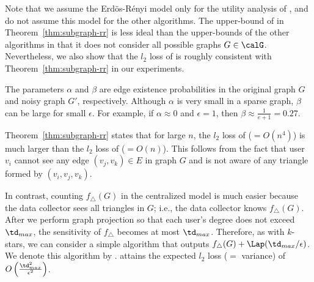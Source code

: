 Note that we assume the Erd\"os-R\'enyi model only for the utility analysis of , and do not assume this model for the other algorithms. 
The upper-bound of  in Theorem~\ref{thm:subgraph-rr} is less ideal than the upper-bounds of the other algorithms in that it does not consider all possible graphs $G \in \calG$. 
Nevertheless, we also show that the $l_2$ loss of  is roughly consistent with Theorem~\ref{thm:subgraph-rr} in our experiments. 

The parameters $\alpha$ and $\beta$ are edge existence probabilities in the original graph $G$ and noisy graph $G'$, respectively. 
Although $\alpha$ is very small in a sparse graph, $\beta$ can be large for small $\epsilon$. 
For example, if $\alpha \approx 0$ and $\epsilon=1$, then $\beta \approx \frac{1}{e+1} = 0.27$. 

Theorem~\ref{thm:subgraph-rr} states that for large $n$, the $l_2$ loss of  
($=O(n^4)$) 
is much larger than the $l_2$ loss of  ($=O(n)$). 
This follows from the fact that user $v_i$ cannot see any edge $(v_j, v_k) \in E$ in graph $G$ and is not aware of any triangle formed by $(v_i, v_j, v_k)$. 

In contrast, counting $f_\triangle(G)$ in the centralized model is much easier because the data collector sees all triangles in $G$; i.e., the data collector knows $f_\triangle(G)$. 
After we perform graph projection \cite{Day_SIGMOD16,Kasiviswanathan_TCC13,Raskhodnikova_arXiv15} so that each user's degree does not exceed $\td_{max}$, 
the 
sensitivity of $f_\triangle$ becomes at most $\td_{max}$. 
Therefore, as with $k$-stars, we can consider a simple algorithm that 
outputs $f_{\triangle}(G) + \Lap(\td_{max}/\epsilon)$. 
We denote this algorithm by . 
 attains the expected $l_2$ loss ($=$ variance) of $O\left(\frac{\td_{max}^2}{\epsilon^2}\right)$. 

